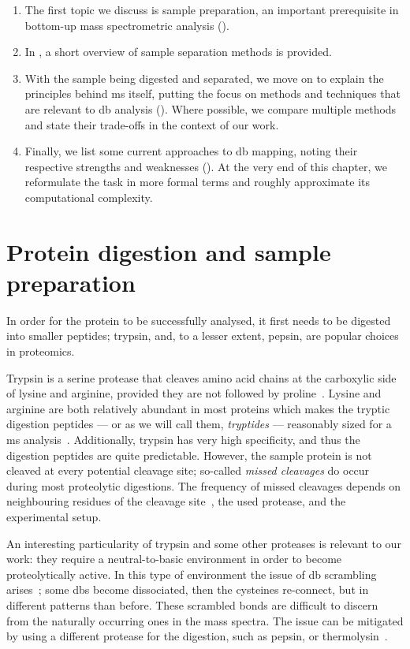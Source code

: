 \begin{enumerate}
  \item The first topic we discuss is sample preparation, an important prerequisite in bottom-up mass spectrometric analysis ().
  \item In , a short overview of sample separation methods is provided.
  \item With the sample being digested and separated, we move on to explain the principles behind \gls*{ms} itself, putting the focus on methods and techniques that are relevant to \gls*{db} analysis (). Where possible, we compare multiple methods and state their trade-offs in the context of our work.
  \item Finally, we list some current approaches to \gls*{db} mapping, noting their respective strengths and weaknesses (). At the very end of this chapter, we reformulate the task in more formal terms and roughly approximate its computational complexity.
\end{enumerate}

\section{Protein digestion and sample preparation}\label{sec:trypsin}

In order for the protein to be successfully analysed, it first needs to be digested into smaller peptides; trypsin, and, to a lesser extent, pepsin, are popular choices in proteomics.

Trypsin is a serine protease that cleaves amino acid chains at the carboxylic side of lysine and arginine, provided they are not followed by proline~\cite{olsen2004trypsin}. Lysine and arginine are both relatively abundant in most proteins which makes the tryptic digestion peptides --- or as we will call them, \emph{tryptides} --- reasonably sized for a \gls*{ms} analysis~\cite{matthiesen2007mass}. Additionally, trypsin has very high specificity, and thus the digestion peptides are quite predictable. However, the sample protein is not cleaved at every potential cleavage site; so-called \emph{missed cleavages} do occur during most proteolytic digestions. The frequency of missed cleavages depends on neighbouring residues of the cleavage site~\cite{gershon2014cleaved}, the used protease, and the experimental setup.

An interesting particularity of trypsin and some other proteases is relevant to our work: they require a neutral-to-basic environment in order to become proteolytically active. In this type of environment the issue of \gls*{db} scrambling arises~\cite{wu1997novel}; some \glspl*{db} become dissociated, then the cysteines re-connect, but in different patterns than before. These scrambled bonds are difficult to discern from the naturally occurring ones in the mass spectra. The issue can be mitigated by using a different protease for the digestion, such as pepsin, or thermolysin~\cite{sung2016evaluation}.

